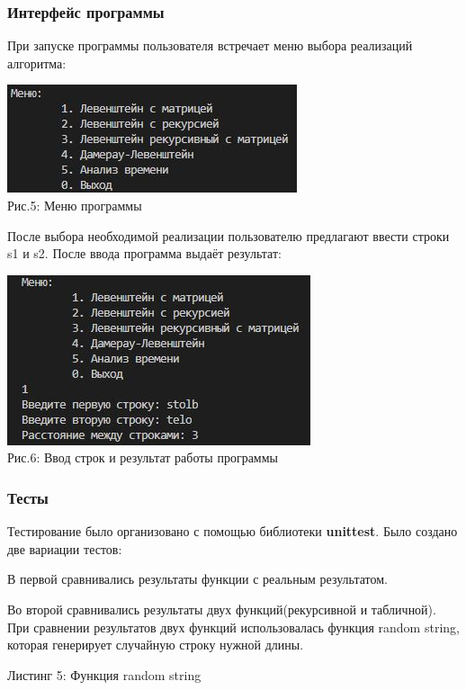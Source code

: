 \documentclass[12pt,a4paper]{article}
\begin{document}
\subsubsection{Интерфейс программы}
При запуске программы пользователя встречает меню выбора реализаций алгоритма:\\
\begin{center}
	\includegraphics{menu}\\
	Рис.5: Меню программы
\end{center}
После выбора необходимой реализации пользователю предлагают ввести строки s1 и s2. После ввода программа выдаёт результат:\\
\begin{center}
	\includegraphics{examp}\\
	Рис.6: Ввод строк и результат работы программы
\end{center}
\subsubsection{Тесты}
Тестирование было организовано с помощью библиотеки  \textbf{unittest}.
Было создано две вариации тестов:

В первой сравнивались результаты функции с реальным результатом.

Во второй сравнивались результаты двух функций(рекурсивной и табличной).
При сравнении результатов двух функций использовалась функция random string, которая генерирует случайную строку нужной длины.
\begin{center}
	Листинг 5: Функция random string
	
\end{center}
\clearpage
\end{document}

